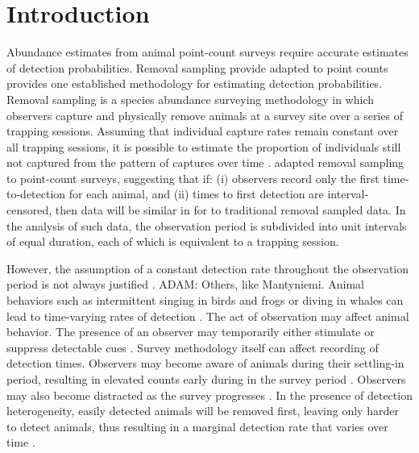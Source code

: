 \documentclass[useAMS,usenatbib,referee,12pt]{article}
\newcommand{\adam}[1]{{\color{blue} ADAM: #1}}
\begin{document}
\section{Introduction}\label{sec:intro}

Abundance estimates from animal point-count surveys require accurate estimates of detection probabilities.  
Removal sampling provide adapted to point counts provides one established methodology for estimating detection probabilities.
Removal sampling is a species abundance surveying methodology in which observers capture and physically remove animals at a survey site over a series of trapping sessions.
Assuming that individual capture rates remain constant over all trapping sessions, it is possible to estimate the proportion of individuals still not captured from the pattern of captures over time .  
\citet{Farnsworth2002} adapted removal sampling to point-count surveys, suggesting that if: (i) observers record only the first time-to-detection for each animal, and (ii) times to first detection are interval-censored, then data will be similar in for to traditional removal sampled data.
In the analysis of such data, the observation period is subdivided into unit intervals of equal duration, each of which is equivalent to a trapping session.


However, the assumption of a constant detection rate throughout the observation period is not always justified \citep{Alldredge2007}. \adam{Others, like Mantyniemi.}  
Animal behaviors such as intermittent singing in birds and frogs or diving in whales can lead to time-varying rates of detection \citep{Scott2005, Diefenbach2007, Reidy2011, Borcherspre-print}.  
The act of observation may affect animal behavior.  
The presence of an observer may temporarily either stimulate or suppress detectable cues \citep{McSheaRappole1997, Rosenstock2002, Alldredge2007}.  
Survey methodology itself can affect recording of detection times.  
Observers may become aware of animals during their settling-in period, resulting in elevated counts early during in the survey period \citep{LeeMarsden2008}.  
Observers may also become distracted as the survey progresses \citep{Johnson2008}.  
In the presence of detection heterogeneity, easily detected animals will be removed first, leaving only harder to detect animals, thus resulting in a marginal detection rate that varies over time \citep{Farnsworth2005}.
\end{document}
